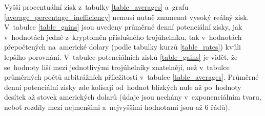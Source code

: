\documentclass[thesis=B,czech]{FITthesis}[2019/03/21]
\begin{document}
Vyšší procentuální zisk z~tabulky \ref{table_averages} a~grafu \ref{average_percentage_inefficiency} nemusí nutně znamenat vysoký reálný zisk. V~tabulce \ref{table_gains} jsou uvedeny průměrné denní potenciální zisky, jak v~hodnotách jedné z~kryptoměn příslušného trojúhelníku, tak v~hodnotách přepočtených na~americké dolary (podle tabulky kurzů \ref{table_rates}) kvůli lepšího porovnání. V~tabulce potenciálních zisků \ref{table_gains} je vidět, že se~hodnoty liší mezi jednotlivými trojúhelníky znatelněji, než v~tabulce průměrných počtů arbitrážních příležitostí v~tabulce \ref{table_averages}. Průměrné denní potenciální zisky zde kolísají od~hodnot blízkých nule až po~hodnoty desítek až stovek amerických dolarů (údaje jsou nechány v~exponenciálním tvaru, neboť rozdíly mezi nejmenšími a~nejvyššími hodnotami jsou až 6 řádů). 


\end{document}
